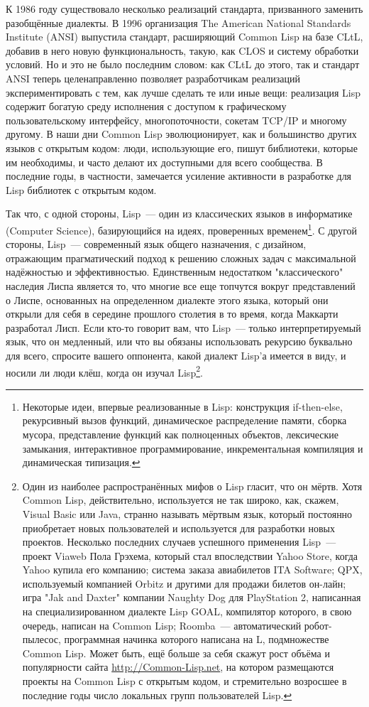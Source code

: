 К 1986 году существовало несколько реализаций стандарта, призванного заменить разобщённые
диалекты. В 1996 организация The American National Standards Institute (ANSI) выпустила
стандарт, расширяющий Common Lisp на базе CLtL, добавив в него новую функциональность,
такую, как CLOS и систему обработки условий. Но и это не было последним словом: как CLtL
до этого, так и стандарт ANSI теперь целенаправленно позволяет разработчикам реализаций
экспериментировать с тем, как лучше сделать те или иные вещи: реализация Lisp содержит
богатую среду исполнения с доступом к графическому пользовательскому интерфейсу,
многопоточности, сокетам TCP/IP и многому другому. В наши дни Common Lisp эволюционирует,
как и большинство других языков с открытым кодом: люди, использующие его, пишут
библиотеки, которые им необходимы, и часто делают их доступными для всего сообщества. В
последние годы, в частности, замечается усиление активности в разработке для Lisp
библиотек с открытым кодом.

Так что, с одной стороны, Lisp~--- один из классических языков в информатике (Computer
Science), базирующийся на идеях, проверенных временем\footnote{Некоторые идеи, впервые
  реализованные в Lisp: конструкция if-then-else, рекурсивный вызов функций, динамическое
  распределение памяти, сборка мусора, представление функций как полноценных объектов,
  лексические замыкания, интерактивное программирование, инкрементальная компиляция и
  динамическая типизация.}. С другой стороны, Lisp~--- современный язык общего назначения,
с дизайном, отражающим прагматический подход к решению сложных задач с максимальной
надёжностью и эффективностью. Единственным недостатком "классического" наследия Лиспа
является то, что многие все еще топчутся вокруг представлений о Лиспе, основанных на
определенном диалекте этого языка, который они открыли для себя в середине прошлого
столетия в то время, когда Маккарти разработал Лисп. Если кто-то говорит вам, что Lisp~---
только интерпретируемый язык, что он медленный, или что вы обязаны использовать рекурсию
буквально для всего, спросите вашего оппонента, какой диалект Lisp'а имеется в видy, и
носили ли люди клёш, когда он изучал Lisp\footnote{Один из наиболее распространённых мифов
  о Lisp гласит, что он мёртв. Хотя Common Lisp, действительно, используется не так
  широко, как, скажем, Visual Basic или Java, странно называть мёртвым язык, который
  постоянно приобретает новых пользователей и используется для разработки новых
  проектов. Несколько последних случаев успешного применения Lisp~--- проект Viaweb Пола
  Грэхема, который стал впоследствии Yahoo Store, когда Yahoo купила его компанию; система
  заказа авиабилетов ITA Software; QPX, используемый компанией Orbitz и другими для
  продажи билетов он-лайн; игра "Jak and Daxter" компании Naughty Dog для PlayStation 2,
  написанная на специализированном диалекте Lisp GOAL, компилятор которого, в свою
  очередь, написан на Common Lisp; Roomba~--- автоматический робот-пылесос, программная
  начинка которого написана на L, подмножестве Common Lisp. Может быть, ещё больше за себя
  скажут рост объёма и популярности сайта \url{http://Common-Lisp.net}, на котором
  размещаются проекты на Common Lisp с открытым кодом, и стремительно возросшее в
  последние годы число локальных групп пользователей Lisp.}.

